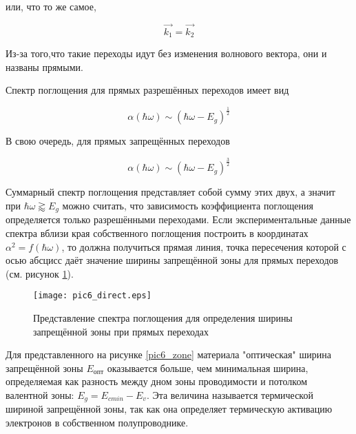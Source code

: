 или, что то же самое,

\begin{equation}
\overrightarrow{k_{1}} = \overrightarrow{k_{2}}
\end{equation}

Из-за того,что такие переходы идут без изменения волнового вектора, они и названы прямыми.

Спектр поглощения для прямых разрешённых переходов имеет вид

\begin{equation}
\alpha(\hbar \omega) \sim (\hbar \omega - E_{g})^{\frac{1}{2}}
\end{equation}

В свою очередь, для прямых запрещённых переходов

\begin{equation}
\alpha(\hbar \omega) \sim (\hbar \omega - E_{g})^{\frac{3}{2}}
\end{equation}

Суммарный спектр поглощения представляет собой сумму этих двух, а значит при $\hbar \omega \gtrapprox E_{g}$ можно считать, что зависимость коэффициента поглощения определяется только разрешёнными переходами. Если экспериментальные данные спектра вблизи края собственного поглощения построить в координатах $\alpha^2 = f(\hbar \omega)$, то должна получиться прямая линия, точка пересечения которой с осью абсцисс даёт значение ширины запрещённой зоны для прямых переходов (см. рисунок \ref{pic6_direct}).

\begin{figure}[h!]\centering
\texttt{[image: pic6\_direct.eps]}
\caption{Представление спектра поглощения для определения ширины запрещённой зоны при прямых переходах}
\label{pic6_direct}
\end{figure}

Для представленного на рисунке \ref{pic6_zone} материала "оптическая" ширина запрещённой зоны $E_{\text{опт}}$ оказывается больше, чем минимальная ширина, определяемая как разность между дном зоны проводимости и потолком валентной зоны: $E_{g} = E_{c min} - E_{v}$. Эта величина называется термической шириной запрещённой зоны, так как она определяет термическую активацию электронов в собственном полупроводнике.

